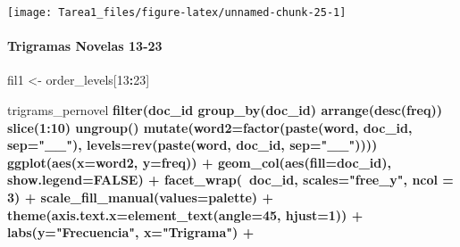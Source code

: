 \documentclass[
]{article}
\newenvironment{Shaded}{\begin{snugshade}}{\end{snugshade}}
\newcommand{\DataTypeTok}[1]{\textcolor[rgb]{0.13,0.29,0.53}{#1}}
\newcommand{\DecValTok}[1]{\textcolor[rgb]{0.00,0.00,0.81}{#1}}
\newcommand{\KeywordTok}[1]{\textcolor[rgb]{0.13,0.29,0.53}{\textbf{#1}}}
\newcommand{\NormalTok}[1]{#1}
\newcommand{\OperatorTok}[1]{\textcolor[rgb]{0.81,0.36,0.00}{\textbf{#1}}}
\newcommand{\OtherTok}[1]{\textcolor[rgb]{0.56,0.35,0.01}{#1}}
\newcommand{\StringTok}[1]{\textcolor[rgb]{0.31,0.60,0.02}{#1}}
\begin{document}
\texttt{[image: Tarea1\_files/figure-latex/unnamed-chunk-25-1]}

\hypertarget{trigramas-novelas-13-23}{%
\paragraph{\texorpdfstring{\textbf{Trigramas Novelas
13-23}}{Trigramas Novelas 13-23}}\label{trigramas-novelas-13-23}}

\begin{Shaded}
\begin{Highlighting}[]
\NormalTok{fil1 <-}\StringTok{ }\NormalTok{order_levels[}\DecValTok{13}\OperatorTok{:}\DecValTok{23}\NormalTok{]}

\NormalTok{trigrams_pernovel }\OperatorTok{%
\StringTok{  }\KeywordTok{filter}\NormalTok{(doc_id }\OperatorTok{%
\StringTok{  }\KeywordTok{group_by}\NormalTok{(doc_id) }\OperatorTok{%
\StringTok{  }\KeywordTok{arrange}\NormalTok{(}\KeywordTok{desc}\NormalTok{(freq)) }\OperatorTok{%
\StringTok{  }\KeywordTok{slice}\NormalTok{(}\DecValTok{1}\OperatorTok{:}\DecValTok{10}\NormalTok{) }\OperatorTok{%
\StringTok{  }\KeywordTok{ungroup}\NormalTok{() }\OperatorTok{%
\StringTok{  }\KeywordTok{mutate}\NormalTok{(}\DataTypeTok{word2=}\KeywordTok{factor}\NormalTok{(}\KeywordTok{paste}\NormalTok{(word, doc_id, }\DataTypeTok{sep=}\StringTok{"__"}\NormalTok{), }
                      \DataTypeTok{levels=}\KeywordTok{rev}\NormalTok{(}\KeywordTok{paste}\NormalTok{(word, doc_id, }\DataTypeTok{sep=}\StringTok{"__"}\NormalTok{))))}\OperatorTok{%
\StringTok{  }\KeywordTok{ggplot}\NormalTok{(}\KeywordTok{aes}\NormalTok{(}\DataTypeTok{x=}\NormalTok{word2, }\DataTypeTok{y=}\NormalTok{freq)) }\OperatorTok{+}
\StringTok{  }\KeywordTok{geom_col}\NormalTok{(}\KeywordTok{aes}\NormalTok{(}\DataTypeTok{fill=}\NormalTok{doc_id), }\DataTypeTok{show.legend=}\OtherTok{FALSE}\NormalTok{) }\OperatorTok{+}
\StringTok{  }\KeywordTok{facet_wrap}\NormalTok{(}\OperatorTok{~}\NormalTok{doc_id, }\DataTypeTok{scales=}\StringTok{"free_y"}\NormalTok{, }\DataTypeTok{ncol =} \DecValTok{3}\NormalTok{) }\OperatorTok{+}
\StringTok{  }\KeywordTok{scale_fill_manual}\NormalTok{(}\DataTypeTok{values=}\NormalTok{palette) }\OperatorTok{+}
\StringTok{  }\KeywordTok{theme}\NormalTok{(}\DataTypeTok{axis.text.x=}\KeywordTok{element_text}\NormalTok{(}\DataTypeTok{angle=}\DecValTok{45}\NormalTok{, }\DataTypeTok{hjust=}\DecValTok{1}\NormalTok{)) }\OperatorTok{+}
\StringTok{  }\KeywordTok{labs}\NormalTok{(}\DataTypeTok{y=}\StringTok{"Frecuencia"}\NormalTok{, }\DataTypeTok{x=}\StringTok{"Trigrama"}\NormalTok{) }\OperatorTok{+}
}}}}}}}
\end{Highlighting}
\end{Shaded}
\end{document}
